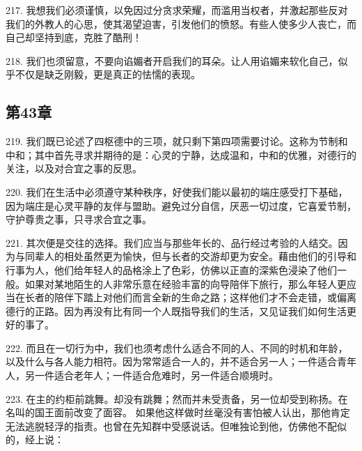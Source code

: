 \par

217. 我想我们必须谨慎，以免因过分贪求荣耀，而滥用当权者，并激起那些反对我们的外教人的心思，使其渴望迫害，引发他们的愤怒。有些人使多少人丧亡，而自己却坚持到底，克胜了酷刑！\par

218. 我们也须留意，不要向谄媚者开启我们的耳朵。让人用谄媚来软化自己，似乎不仅是缺乏刚毅，更是真正的怯懦的表现。\par


\subsection{第43章}

\par

219. 我们既已论述了四枢德中的三项，就只剩下第四项需要讨论。这称为节制和中和；其中首先寻求并期待的是：心灵的宁静，达成温和，中和的优雅，对德行的关注，以及对合宜之事的反思。\par

220. 我们在生活中必须遵守某种秩序，好使我们能以最初的端庄感受打下基础，因为端庄是心灵平静的友伴与盟助。避免过分自信，厌恶一切过度，它喜爱节制，守护尊贵之事，只寻求合宜之事。\par

221. 其次便是交往的选择。我们应当与那些年长的、品行经过考验的人结交。因为与同辈人的相处虽然更为愉快，但与长者的交游却更为安全。藉由他们的引导和行事为人，他们给年轻人的品格涂上了色彩，仿佛以正直的深紫色浸染了他们一般。如果对某地陌生的人非常乐意在经验丰富的向导陪伴下旅行，那么年轻人更应当在长者的陪伴下踏上对他们而言全新的生命之路；这样他们才不会走错，或偏离德行的正路。因为再没有比有同一个人既指导我们的生活，又见证我们如何生活更好的事了。\par

222. 而且在一切行为中，我们也须考虑什么适合不同的人、不同的时机和年龄，以及什么与各人能力相符。因为常常适合一人的，并不适合另一人；一件适合青年人，另一件适合老年人；一件适合危难时，另一件适合顺境时。\par

223. 在主的约柜前跳舞。却没有跳舞；然而并未受责备，另一位却受到称扬。在名叫的国王面前改变了面容。 如果他这样做时丝毫没有害怕被人认出，那他肯定无法逃脱轻浮的指责。也曾在先知群中受感说话。但唯独论到他，仿佛他不配似的，经上说：\par

